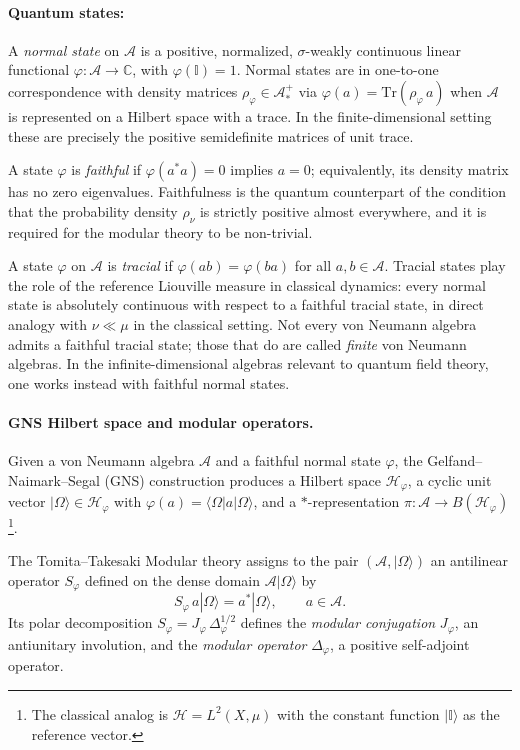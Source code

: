 \documentclass[a4paper,11pt]{article}
\theoremstyle{definition}
\newcommand{\id}{\mathbb{I}}
\newcommand{\Tr}{\text{Tr}}
\begin{document}
\paragraph{Quantum states:}
A \emph{normal state} on $\mathcal{A}$ is a positive, normalized, $\sigma$-weakly continuous
linear functional $\varphi:\mathcal{A}\to\mathbb{C}$, with $\varphi(\id)=1$.  Normal states
are in one-to-one correspondence with density matrices $\rho_\varphi\in\mathcal{A}_*^+$ via
$\varphi(a)=\Tr(\rho_\varphi\, a)$ when $\mathcal{A}$ is represented on a Hilbert space with
a trace.  In the finite-dimensional setting these are precisely the positive semidefinite
matrices of unit trace.

A state $\varphi$ is \emph{faithful} if $\varphi(a^*a)=0$ implies $a=0$; equivalently,
its density matrix has no zero eigenvalues.  Faithfulness is the quantum counterpart of the
condition that the probability density $\rho_\nu$ is strictly positive almost everywhere,
and it is required for the modular theory to be non-trivial.

A state $\varphi$ on $\mathcal{A}$ is \emph{tracial} if $\varphi(ab)=\varphi(ba)$ for
all $a,b\in\mathcal{A}$.  Tracial states play the role of the reference Liouville measure in classical dynamics:
every normal state is absolutely continuous with respect to a faithful tracial state, in
direct analogy with $\nu\ll\mu$ in the classical setting.  Not every von Neumann algebra
admits a faithful tracial state; those that do are called \emph{finite} von Neumann algebras.
In the infinite-dimensional algebras relevant to quantum field theory, one works instead with
faithful normal states.

\paragraph{GNS Hilbert space and modular operators.}
Given a von Neumann algebra $\mathcal{A}$ and a faithful normal state $\varphi$, the
Gelfand--Naimark--Segal (GNS) construction produces a Hilbert space $\mathcal{H}_\varphi$,
a cyclic unit vector $|\Omega\rangle\in\mathcal{H}_\varphi$ with
$\varphi(a)=\langle\Omega|a|\Omega\rangle$, and a $*$-representation
$\pi:\mathcal{A}\to B(\mathcal{H}_\varphi)$ \footnote{The classical analog is $\mathcal{H}=L^2(X,\mu)$
with the constant function $|\id\rangle$ as the reference vector.}.

The Tomita--Takesaki Modular theory assigns to the pair $(\mathcal{A},|\Omega\rangle)$ an
antilinear operator $S_\varphi$ defined on the dense domain
$\mathcal{A}|\Omega\rangle$ by
\begin{equation}
  S_\varphi\, a|\Omega\rangle = a^*|\Omega\rangle, \qquad a\in\mathcal{A}.
  \label{eq:Tomita-S}
\end{equation}
Its polar decomposition $S_\varphi = J_\varphi\,\Delta_\varphi^{1/2}$ defines the
\emph{modular conjugation} $J_\varphi$, an antiunitary involution, and the
\emph{modular operator} $\Delta_\varphi$, a positive self-adjoint operator. 
\end{document}
